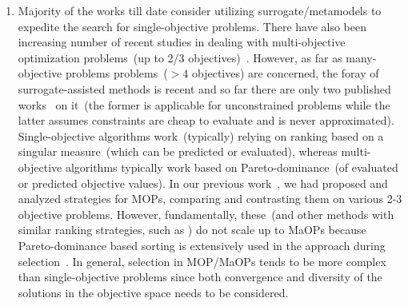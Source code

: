 \documentclass[twocolumn,10pt]{asme2ej}
\begin{document}
\begin{enumerate}

\item Majority of the works till date consider utilizing surrogate/metamodels to expedite the search for single-objective problems. There have also been increasing number of recent studies in dealing with multi-objective optimization problems~(up to 2/3 objectives)~\cite{Knowles2008}. However, as far as many-objective problems problems~($>4$ objectives) are concerned, the foray of surrogate-assisted methods is recent and so far there are only two published works~\cite{KHTchugh2016krvea,KHTchugh2016const} on it~(the former is applicable for unconstrained problems while the latter assumes constraints are cheap to evaluate and is never approximated). Single-objective algorithms work~(typically) relying on ranking based on a singular measure~(which can be predicted or evaluated), whereas multi-objective algorithms typically work based on Pareto-dominance~(of evaluated or predicted objective values). In our previous work~\cite{KHTjmd2016}, we had proposed and analyzed strategies for MOPs, comparing and contrasting them on various 2-3 objective problems. However, fundamentally, these~(and other methods with similar ranking strategies, such as \cite{KHTknowles2006pha}) do not scale up to MaOPs because Pareto-dominance based sorting is extensively used in the approach during selection~\cite{KHTishibuchi2008evolutionary}. In general, selection in MOP/MaOPs tends to be more complex than single-objective problems since both convergence and diversity of the solutions in the objective space needs to be considered.




\end{enumerate}
\end{document}

